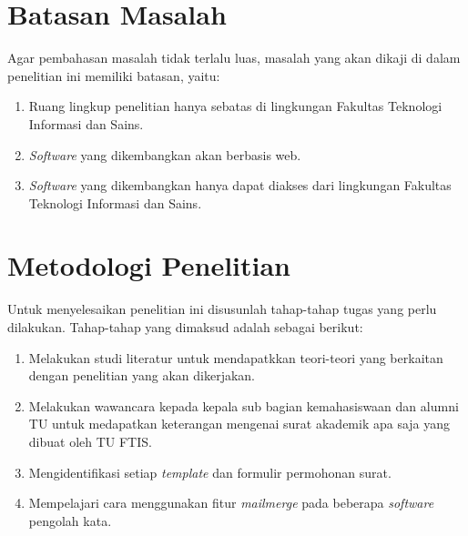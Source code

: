 \section{Batasan Masalah}
\label{sec:batasan_masalah}
Agar pembahasan masalah tidak terlalu luas, masalah yang akan dikaji di dalam penelitian ini memiliki batasan, yaitu:
\begin{enumerate}
	\item Ruang lingkup penelitian hanya sebatas di lingkungan Fakultas Teknologi Informasi dan Sains.
	\item \textit{Software} yang dikembangkan akan berbasis web.
	\item \textit{Software} yang dikembangkan hanya dapat diakses dari lingkungan Fakultas Teknologi Informasi dan Sains.
\end{enumerate}

\section{Metodologi Penelitian}
\label{sec:metodologi_penelitian}
Untuk menyelesaikan penelitian ini disusunlah tahap-tahap tugas yang perlu dilakukan. Tahap-tahap yang dimaksud adalah sebagai berikut:
\begin{enumerate}
	\item Melakukan studi literatur untuk mendapatkkan teori-teori yang berkaitan dengan penelitian yang akan dikerjakan.
	\item Melakukan wawancara kepada kepala sub bagian kemahasiswaan dan alumni TU untuk medapatkan keterangan mengenai surat akademik apa saja yang dibuat oleh TU FTIS.
	\item Mengidentifikasi setiap \textit{template} dan formulir permohonan surat.
	\item Mempelajari cara menggunakan fitur \textit{mailmerge} pada beberapa \textit{software} pengolah kata.
\end{enumerate}

